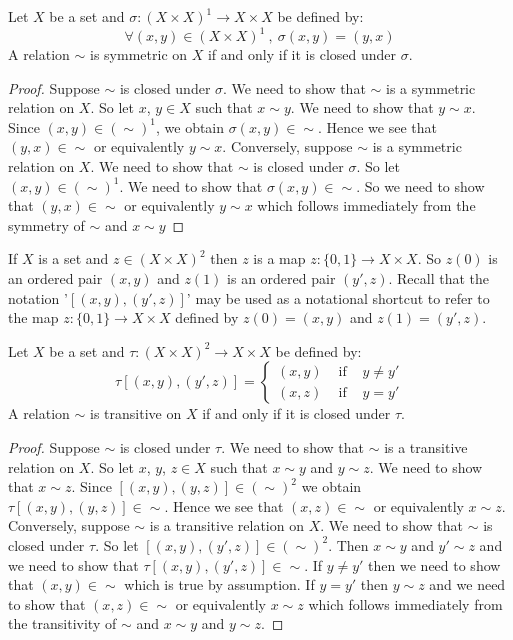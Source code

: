 \begin{lemma}\label{logic:lemma:symmetric}
Let $X$ be a set and $\sigma:(X\times X)^{1}\to X\times X$ be defined by:
    \[
    \forall (x,y)\in (X\times X)^{1}\ ,\ \sigma(x,y) = (y,x)
    \]
A relation $\sim$ is symmetric on $X$ if and only if it is closed
under $\sigma$.
\end{lemma}
\begin{proof}
Suppose $\sim$ is closed under $\sigma$. We need to show that $\sim$
is a symmetric relation on $X$. So let $x$, $y\in X$ such that
$x\sim y$. We need to show that $y\sim x$. Since
$(x,y)\in(\sim)^{1}$, we obtain $\sigma(x,y)\in\sim$. Hence we see
that $(y,x)\in\sim$ or equivalently $y\sim x$. Conversely, suppose
$\sim$ is a symmetric relation on $X$. We need to show that $\sim$
is closed under $\sigma$. So let $(x,y)\in(\sim)^{1}$. We need to
show that $\sigma(x,y)\in\sim$. So we need to show that
$(y,x)\in\sim$ or equivalently $y\sim x$ which follows immediately
from the symmetry of $\sim$ and $x\sim y$
\end{proof}

If $X$ is a set and $z\in(X\times X)^{2}$ then $z$ is a map
$z:\{0,1\}\to X\times X$. So $z(0)$ is an ordered pair $(x,y)$ and
$z(1)$ is an ordered pair $(y',z)$. Recall that the notation
'$[(x,y),(y',z)]$' may be used as a notational shortcut to refer to
the map $z:\{0,1\}\to X\times X$ defined by $z(0)=(x,y)$ and
$z(1)=(y',z)$.

\begin{lemma}\label{logic:lemma:transitive}
Let $X$ be a set and $\tau:(X\times X)^{2}\to X\times X$ be defined by:
    \[
    \tau[(x,y),(y',z)]=\left\{
                    \begin{array}{lcr}
                    (x,y)&\mbox{\ if\ }&y\neq y'\\
                    (x,z)&\mbox{\ if\ }&y=y'
                    \end{array}
                    \right.
    \]
  A relation $\sim$ is transitive on $X$ if and only if it is closed under $\tau$.
\end{lemma}
\begin{proof}
Suppose $\sim$ is closed under $\tau$. We need to show that $\sim$
is a transitive relation on $X$. So let $x$, $y$, $z\in X$ such that
$x\sim y$ and $y\sim z$. We need to show that $x\sim z$. Since
$[(x,y),(y,z)]\in(\sim)^{2}$ we obtain $\tau[(x,y),(y,z)]\in\sim$.
Hence we see that $(x,z)\in\sim$ or equivalently $x\sim z$.
Conversely, suppose $\sim$ is a transitive relation on $X$. We need
to show that $\sim$ is closed under $\tau$. So let
$[(x,y),(y',z)]\in(\sim)^{2}$. Then $x\sim y$ and $y'\sim z$ and we
need to show that $\tau[(x,y),(y',z)]\in\sim$. If $y\neq y'$ then we
need to show that $(x,y)\in\sim$ which is true by assumption. If
$y=y'$ then $y\sim z$ and we need to show that $(x,z)\in\sim$ or
equivalently  $x\sim z$ which follows immediately from the
transitivity of $\sim$ and $x\sim y$ and $y\sim z$.
\end{proof}

